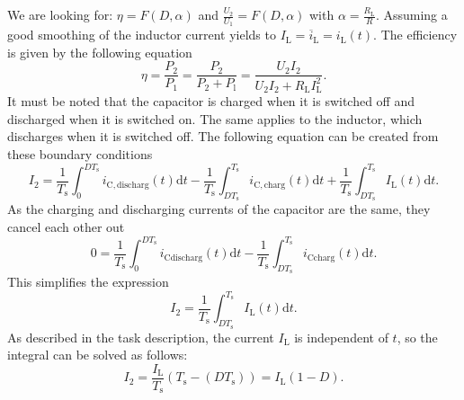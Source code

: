 \begin{solutionblock}
We are looking for: $\eta= F(D,\alpha)$ and $\frac{U_\mathrm{2}}{U_\mathrm{1}}=F(D,\alpha)$ with $\alpha=\frac{R_\mathrm{L}}{R}$.
Assuming a good smoothing of the inductor current yields to $I_\mathrm{L}=\overline i_\mathrm{L}=i_\mathrm{L}(t)$.
The efficiency is given by the following equation
\begin{equation}
    \eta = \frac{P_\mathrm{2}}{P_\mathrm{1}} = \frac{P_\mathrm{2}}{P_\mathrm{2}+P_\mathrm{l}} = \frac{U_\mathrm{2} I_\mathrm{2}}{U_\mathrm{2} I_\mathrm{2} +R_\mathrm{L} I_\mathrm{L}^2} \label{eq:efficiency}.
\end{equation}
It must be noted that the capacitor is charged when it is switched off and discharged when it is switched on. The same applies to the inductor, which discharges when it is switched off. The following equation can be created from these boundary conditions
\begin{equation}
    I_\mathrm{2}=\frac{1}{T_\mathrm{s}} \int_{0}^{DT_\mathrm{s}} i_\mathrm{C, discharg}(t)\mathrm{d}t-\frac{1}{T_\mathrm{s}} \int_{DT_\mathrm{s}}^{T_\mathrm{s}} i_\mathrm{C,charg}(t)\mathrm{d}t+\frac{1}{T_\mathrm{s}} \int_{DT_\mathrm{s}}^{T_\mathrm{s}} I_\mathrm{L}(t)\mathrm{d}t.
\end{equation}
As the charging and discharging currents of the capacitor are the same, they cancel each other out
\begin{equation}
    0 = \frac{1}{T_\mathrm{s}} \int_{0}^{DT_\mathrm{s}} i_\mathrm{C discharg}(t)\mathrm{d}t-\frac{1}{T_\mathrm{s}} \int_{DT_\mathrm{s}}^{T_\mathrm{s}} i_\mathrm{C charg}(t)\mathrm{d}t.
\end{equation}
This simplifies the expression
\begin{equation}
    I_\mathrm{2}= \frac{1}{T_\mathrm{s}} \int_{DT_\mathrm{s}}^{T_\mathrm{s}} I_\mathrm{L}(t)\mathrm{d}t.
\end{equation}
As described in the task description, the current $I_\mathrm{L}$ is independent of $t$, so the integral can be solved as follows:
\begin{equation}
    I_\mathrm{2}= \frac{I_\mathrm{L}}{T_\mathrm{s}}(T_\mathrm{s}-(DT_\mathrm{s}))=I_\mathrm{L}(1-D) \label{eq:current_1}.

\end{equation}
\end{solutionblock}
